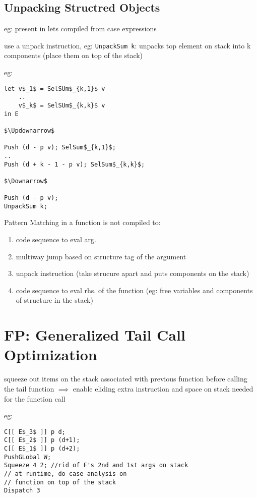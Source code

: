 \documentclass[8pt]{extarticle}
\begin{document}
\begin{multicols*}{2}
\subsection{Unpacking Structred Objects}
eg: present in lets compiled from case expressions

use a unpack instruction, eg: \verb|UnpackSum k|: unpacks top element on stack into k components (place them on top of the stack)

eg:

\begin{lstlisting}
let v$_1$ = SelSUm$_{k,1}$ v
    ..
    v$_k$ = SelSUm$_{k,k}$ v
in E

$\Updownarrow$

Push (d - p v); SelSum$_{k,1}$;
..
Push (d + k - 1 - p v); SelSum$_{k,k}$;

$\Downarrow$

Push (d - p v);
UnpackSum k;
\end{lstlisting}

Pattern Matching in a function is not compiled to:
\begin{enumerate}
\item code sequence to eval arg.
\item multiway jump based on structure tag of the argument
\item unpack instruction (take strucure apart and puts components on the stack)
\item code sequence to eval rhs. of the function (eg: free variables and components of structure in the stack)
\end{enumerate}

\vfill\null
\columnbreak

\section{FP: Generalized Tail Call Optimization}

squeeze out items on the stack associated with previous function before calling the tail function $\implies$ enable eliding extra instruction and space on stack needed for the function call

eg:

\begin{lstlisting}
C[[ E$_3$ ]] p d;
C[[ E$_2$ ]] p (d+1);
C[[ E$_1$ ]] p (d+2);
PushGLobal W;
Squeeze 4 2; //rid of F's 2nd and 1st args on stack
// at runtime, do case analysis on
// function on top of the stack
Dispatch 3 
\end{lstlisting}


\end{multicols*}
\end{document}
